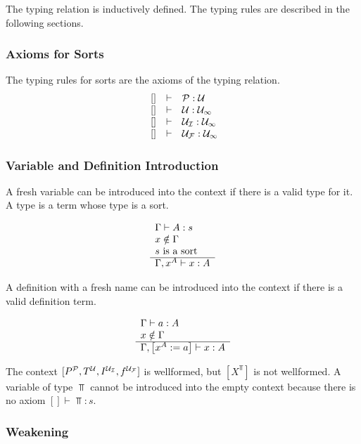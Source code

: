 The typing relation is inductively defined. The typing rules are described in
the following sections.





\subsubsection{Axioms for Sorts}

The typing rules for sorts are the axioms of the typing relation.
$$
\begin{array}{lllll} 
    \ []  &\vdash& {\mathcal P}: {\mathcal U}
    \\
    \ []  &\vdash& {\mathcal U}: {{\mathcal U}_\infty}
    \\
    \ []  &\vdash& {{\mathcal U}_\mathcal I}: {{\mathcal U}_\infty}
    \\
    \ []  &\vdash& {{\mathcal U}_\mathcal F}: {{\mathcal U}_\infty}
 \end{array}
$$




\subsubsection{Variable and Definition Introduction}

A fresh variable can be introduced into the context if there is a valid type for
it. A type is a term whose type is a sort.

$$
\begin{array}{l} 
    \Gamma \vdash A : s
    \\
    x \notin \Gamma
    \\
    s \text{ is a sort}
 \\ \hline 
    \Gamma, x^A \vdash x : A
 \end{array}
$$

A definition with a fresh name can be introduced into the context if there is a
valid definition term.

$$
\begin{array}{l} 
    \Gamma \vdash a : A
    \\
    x \notin \Gamma
 \\ \hline 
    \Gamma, \left[ {x^A := a} \right] \vdash x: A
 \end{array}
$$

The context $[P^{\mathcal P}, T^{\mathcal U}, I^{{\mathcal U}_\mathcal I}, f^{{\mathcal U}_\mathcal F}]$ is wellformed, but
$[X^\Top]$ is not wellformed. A variable of type $\Top$ cannot be introduced
into the empty context because there is no axiom $[] \vdash \Top: s$.






\subsubsection{Weakening}


